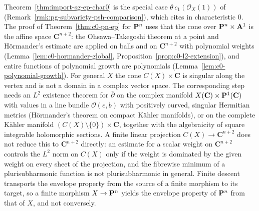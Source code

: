 \begin{remark}\label{rmk:sg-char0}
Theorem~\ref{thm:import-sg-ep-char0} is the special case $\theta\,c_1(\mathcal O_X(1))$ of \cite[Theorem~5.20]{BJ22}
(Remark~\ref{rmk:pg-subvariety-psh-comparison}), which \cite[\S3]{FHX} cites in characteristic $0$. The proof of Theorem~\ref{thm:c0-pn-ep} for
$\mathbf{P}^n$ uses that the cone over $\mathbf{P}^n\times\mathbf{A}^1$ is the affine space $\mathbf C^{n+2}$: the Ohsawa--Takegoshi theorem at a point and
H\"ormander's estimate are applied on balls and on $\mathbf C^{n+2}$ with polynomial weights (Lemma~\ref{lem:c0-hormander-global},
Proposition~\ref{prop:c0-l2-extension}), and entire functions of polynomial growth are polynomials (Lemma~\ref{lem:c0-polynomial-growth}).
For general $X$ the cone $C(X)\times\mathbf C$ is singular along the vertex and is not a domain in a complex vector space. The corresponding
step needs an $L^2$ existence theorem for $\bar\partial$ on the complex manifold $X(\mathbf C)\times\mathbf{P}^1(\mathbf C)$ with values in a line bundle
$\mathcal O(e,b)$ with positively curved, singular Hermitian metrics (H\"ormander's theorem on compact K\"ahler manifolds), or on the complete
K\"ahler manifold $(C(X)\setminus\{0\})\times\mathbf C$, together with the algebraicity of square integrable holomorphic sections. A finite linear
projection $C(X)\to\mathbf C^{n+2}$ does not reduce this to $\mathbf C^{n+2}$ directly: an estimate for a scalar weight on $\mathbf C^{n+2}$ controls the
$L^2$ norm on $C(X)$ only if the weight is dominated by the given weight on every sheet of the projection, and the fibrewise minimum of a
plurisubharmonic function is not plurisubharmonic in general. Finite descent \cite[\S4]{FHX} transports the envelope property from the source of
a finite morphism to its target, so a finite morphism $X\to\mathbf{P}^n$ yields the envelope property of $\mathbf{P}^n$ from that of $X$, and not
conversely.
\end{remark}

